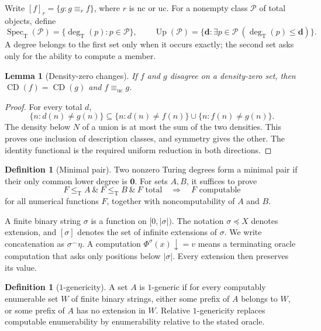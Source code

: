 \documentclass[11pt,a4paper]{article}
\newcommand{\leT}{\leq_{\mathrm T}}
\newcommand{\degT}{\operatorname{deg}_{\mathrm T}}
\newcommand{\CD}{\operatorname{CD}}
\newcommand{\Spec}{\operatorname{Spec}_{\mathrm T}}
\newcommand{\Up}{\operatorname{Up}}
\newcommand{\nc}{\mathrm{nc}}
\newcommand{\uc}{\mathrm{uc}}
\newcommand{\pref}{\preccurlyeq}
\newcommand{\concat}{\mathbin{{}^{\frown}}}
\newtheorem{lemma}[theorem]{Lemma}
\theoremstyle{definition}
\newtheorem{definition}[theorem]{Definition}
\theoremstyle{remark}
\begin{document}
Write $[f]_r=\{g:g\equiv_r f\}$, where $r$ is $\nc$ or $\uc$. For a nonempty class $\mathcal P$ of total objects, define
\[
\Spec(\mathcal P)=\{\degT(p):p\in\mathcal P\},\qquad
\Up(\mathcal P)=\{\mathbf d:\exists p\in\mathcal P\ (\degT(p)\leq\mathbf d)\}.
\]
A degree belongs to the first set only when it occurs exactly; the second set asks only for the ability to compute a member.

\begin{lemma}[Density-zero changes]\label{lem:change}
If $f$ and $g$ disagree on a density-zero set, then $\CD(f)=\CD(g)$ and $f\equiv_{\uc}g$.
\end{lemma}
\begin{proof}
For every total $d$,
\[
\{n:d(n)\ne g(n)\}\subseteq
\{n:d(n)\ne f(n)\}\cup\{n:f(n)\ne g(n)\}.
\]
The density below $N$ of a union is at most the sum of the two densities. This proves one inclusion of description classes, and symmetry gives the other. The identity functional is the required uniform reduction in both directions.
\end{proof}

\begin{definition}[Minimal pair]
Two nonzero Turing degrees form a minimal pair if their only common lower degree is $\mathbf0$. For sets $A,B$, it suffices to prove
\begin{equation}\label{eq:minimal-pair}
F\leT A\ \&\ F\leT B\ \&\ F\text{ total}
\quad\Longrightarrow\quad F\text{ computable}
\end{equation}
for all numerical functions $F$, together with noncomputability of $A$ and $B$.
\end{definition}

A finite binary string $\sigma$ is a function on $[0,|\sigma|)$. The notation $\sigma\pref X$ denotes extension, and $[\sigma]$ denotes the set of infinite extensions of $\sigma$. We write concatenation as $\sigma\concat\eta$. A computation $\Phi^\sigma(x)\downarrow=v$ means a terminating oracle computation that asks only positions below $|\sigma|$. Every extension then preserves its value.

\begin{definition}[$1$-genericity]
A set $A$ is $1$-generic if for every computably enumerable set $W$ of finite binary strings, either some prefix of $A$ belongs to $W$, or some prefix of $A$ has no extension in $W$. Relative $1$-genericity replaces computable enumerability by enumerability relative to the stated oracle.
\end{definition}
\end{document}
